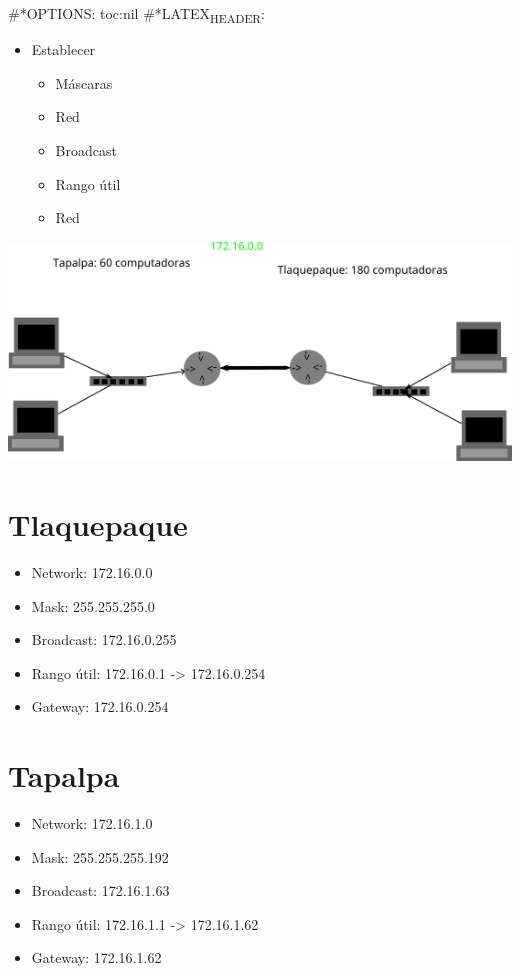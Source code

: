 \documentclass[11pt]{article}
\author{Diego Domínguez}
\date{\today}
\title{}
\begin{document}
\tableofcontents

\#*OPTIONS: toc:nil
\#*LATEX\textsubscript{HEADER}: 

\begin{itemize}
\item Establecer
\begin{itemize}
\item Máscaras
\item Red
\item Broadcast
\item Rango útil
\item Red
\end{itemize}
\end{itemize}

\begin{center}
\includegraphics[width=.9\linewidth]{./ejercicio.png}
\end{center}


\section{Tlaquepaque}
\label{sec:orgefb3d7f}
\begin{itemize}
\item Network: 172.16.0.0
\item Mask: 255.255.255.0
\item Broadcast: 172.16.0.255
\item Rango útil: 172.16.0.1 -> 172.16.0.254
\item Gateway: 172.16.0.254
\end{itemize}

\section{Tapalpa}
\label{sec:orgb742e66}
\begin{itemize}
\item Network: 172.16.1.0
\item Mask: 255.255.255.192
\item Broadcast: 172.16.1.63
\item Rango útil: 172.16.1.1 -> 172.16.1.62
\item Gateway: 172.16.1.62
\end{itemize}
\end{document}
